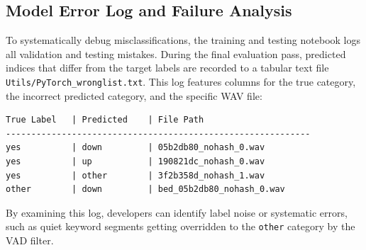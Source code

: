 \subsection{Model Error Log and Failure Analysis}
To systematically debug misclassifications, the training and testing notebook logs all validation and testing mistakes. During the final evaluation pass, predicted indices that differ from the target labels are recorded to a tabular text file \texttt{Utils/PyTorch\_wronglist.txt}. This log features columns for the true category, the incorrect predicted category, and the specific WAV file:
\begin{lstlisting}[caption={Sample Failure Log Format (PyTorch\_wronglist.txt)}]
True Label   | Predicted    | File Path
------------------------------------------------------------
yes          | down         | 05b2db80_nohash_0.wav
yes          | up           | 190821dc_nohash_0.wav
yes          | other        | 3f2b358d_nohash_1.wav
other        | down         | bed_05b2db80_nohash_0.wav
\end{lstlisting}
By examining this log, developers can identify label noise or systematic errors, such as quiet keyword segments getting overridden to the \texttt{other} category by the VAD filter.

